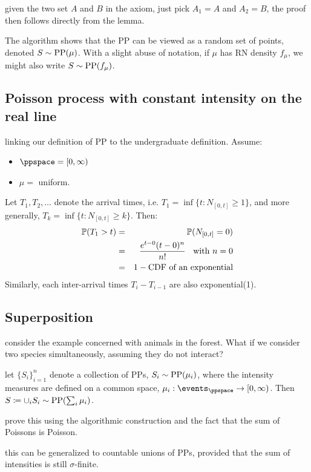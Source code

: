 \documentclass{article}
\begin{document}
 given the two set $A$ and $B$ in the axiom, just pick $A_1 = A$ and $A_2 = B$, the proof then follows directly from the lemma.

 The algorithm shows that the PP can be viewed as a random set of points, denoted $S \sim \PP(\mu)$. With a slight abuse of notation, if $\mu$ has RN density $f_\mu$, we might also write $S \sim \PP(f_\mu)$.


\subsection{Poisson process with constant intensity on the real line}

 linking our definition of PP to the undergraduate definition. Assume:
\begin{itemize}
  \item $\ppspace = [0, \infty)$
  \item $\mu =$ uniform.
\end{itemize}
Let $T_1, T_2, \dots$ denote the arrival times, i.e. $T_1 = \inf\{t : N_{[0,t]} \ge 1\}$, and more generally, $T_k = \inf\{t : N_{[0,t]} \ge k\}$.
Then:
\begin{eqnarray}
\P(T_1 > t) &=& \P(N_{[0,t]} = 0) \\
&=& \frac{e^{t - 0} (t-0)^n}{n!} \;\;\text{ with }n=0 \\
&=& 1 - \text{CDF of an exponential}
\end{eqnarray}
Similarly, each inter-arrival times $T_i - T_{i-1}$ are also exponential(1).


\subsection{Superposition}

 consider the example concerned with animals in the forest. What if we consider two species simultaneously, assuming they do not interact?

 let $\{S_i\}_{i = 1}^n$ denote a collection of PPs, $S_i \sim \PP(\mu_i)$, where the intensity measures are defined on a common space, $\mu_i : \events_{\ppspace} \to [0, \infty)$. Then $S \defeq \cup_i S_i \sim \PP(\sum_i \mu_i)$.

 prove this using the algorithmic construction and the fact that the sum of Poissons is Poisson. 

 this can be generalized to countable unions of PPs, provided that the sum of intensities is still $\sigma$-finite. 
\end{document}
